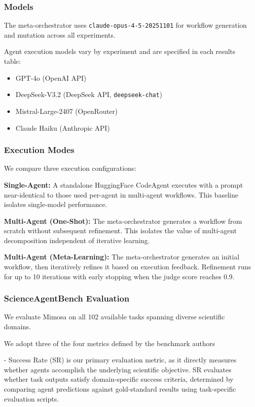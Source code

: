 \documentclass{article}
\begin{document}
\subsubsection{Models}

The meta-orchestrator uses \texttt{claude-opus-4-5-20251101} for workflow generation and mutation across all experiments.

Agent execution models vary by experiment and are specified in each results table:
\begin{itemize}
    \item GPT-4o (OpenAI API)
    \item DeepSeek-V3.2 (DeepSeek API, \texttt{deepseek-chat})
    \item Mistral-Large-2407 (OpenRouter)
    \item Claude Haiku (Anthropic API)
\end{itemize}

\subsubsection{Execution Modes}

We compare three execution configurations:

\textbf{Single-Agent:} A standalone HuggingFace CodeAgent executes with a prompt near-identical to those used per-agent in multi-agent workflows. This baseline isolates single-model performance.

\textbf{Multi-Agent (One-Shot):} The meta-orchestrator generates a workflow from scratch without subsequent refinement. This isolates the value of multi-agent decomposition independent of iterative learning.

\textbf{Multi-Agent (Meta-Learning):} The meta-orchestrator generates an initial workflow, then iteratively refines it based on execution feedback. Refinement runs for up to 10 iterations with early stopping when the judge score reaches 0.9.

\subsubsection{ScienceAgentBench Evaluation}

We evaluate Mimosa on all 102 available tasks spanning diverse scientific domains.

We adopt three of the four metrics defined by the benchmark authors

- Success Rate (SR) is our primary evaluation metric, as it directly measures whether agents accomplish the underlying scientific objective. SR evaluates whether task outputs satisfy domain-specific success criteria, determined by comparing agent predictions against gold-standard results using task-specific evaluation scripts.
\end{document}
